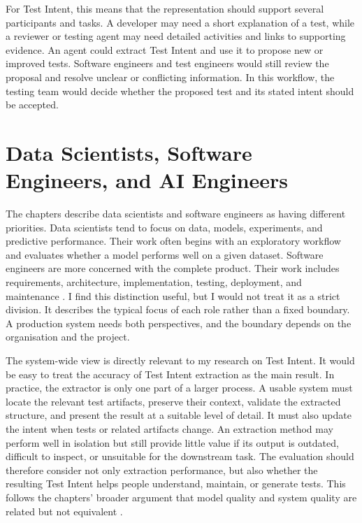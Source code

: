 For Test Intent, this means that the representation should support several participants and tasks. A developer may need a short explanation of a test, while a reviewer or testing agent may need detailed activities and links to supporting evidence. An agent could extract Test Intent and use it to propose new or improved tests. Software engineers and test engineers would still review the proposal and resolve unclear or conflicting information. In this workflow, the testing team would decide whether the proposed test and its stated intent should be accepted.

\section{Data Scientists, Software Engineers, and AI Engineers}

The chapters describe data scientists and software engineers as having different priorities. Data scientists tend to focus on data, models, experiments, and predictive performance. Their work often begins with an exploratory workflow and evaluates whether a model performs well on a given dataset. Software engineers are more concerned with the complete product. Their work includes requirements, architecture, implementation, testing, deployment, and maintenance \cite{K:25}. I find this distinction useful, but I would not treat it as a strict division. It describes the typical focus of each role rather than a fixed boundary. A production system needs both perspectives, and the boundary depends on the organisation and the project.

The system-wide view is directly relevant to my research on Test Intent. It would be easy to treat the accuracy of Test Intent extraction as the main result. In practice, the extractor is only one part of a larger process. A usable system must locate the relevant test artifacts, preserve their context, validate the extracted structure, and present the result at a suitable level of detail. It must also update the intent when tests or related artifacts change. An extraction method may perform well in isolation but still provide little value if its output is outdated, difficult to inspect, or unsuitable for the downstream task. The evaluation should therefore consider not only extraction performance, but also whether the resulting Test Intent helps people understand, maintain, or generate tests. This follows the chapters' broader argument that model quality and system quality are related but not equivalent \cite{K:25}.

